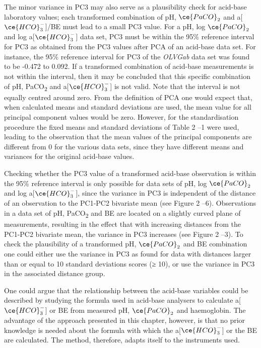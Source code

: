 \documentclass[
  12pt,
  a4paperpaper,
]{report}
\begin{document}
The minor variance in PC3 may also serve as a plausibility check for
acid-base laboratory values; each transformed combination of pH,
\(\ce{PaCO}_{2}\) and a{[}\(\ce{HCO}_{3}^{-}\){]}/BE must lead to a
small PC3 value. For a pH, log \(\ce{PaCO}_{2}\) and log
a{[}\(\ce{HCO}_{3}^{-}\){]} data set, PC3 must be within the 95\%
reference interval for PC3 as obtained from the PC3 values after PCA of
an acid-base data set. For instance, the 95\% reference interval for PC3
of the \emph{OLVGab} data set was found to be -0.472 to 0.092. If a
transformed combination of acid-base measurements is not within the
interval, then it may be concluded that this specific combination of pH,
PaCO­\textsubscript{2} and a{[}\(\ce{HCO}_{3}^{-}\){]} is not valid.
Note that the interval is not equally centred around zero. From the
definition of PCA one would expect that, when calculated means and
standard deviations are used, the mean value for all principal component
values would be zero. However, for the standardisation procedure the
fixed means and standard deviations of Table 2 --1 were used, leading to
the observation that the mean values of the principal components are
different from 0 for the various data sets, since they have different
means and variances for the original acid-base values.

Checking whether the PC3 value of a transformed acid-base observation is
within the 95\% reference interval is only possible for data sets of pH,
log \(\ce{PaCO}_{2}\) and log a{[}\(\ce{HCO}_{3}^{-}\){]}, since the
variance in PC3 is independent of the distance of an observation to the
PC1-PC2 bivariate mean (see Figure 2 --6). Observations in a data set of
pH, PaCO­­\textsubscript{2} and BE are located on a slightly curved
plane of measurements, resulting in the effect that with increasing
distances from the PC1-PC2 bivariate mean, the variance in PC3 increases
(see Figure 2 --3). To check the plausibility of a transformed pH,
\(\ce{PaCO}_{2}\) and BE combination one could either use the variance
in PC3 as found for data with distances larger than or equal to 10
standard deviations scores (≥ 10), or use the variance in PC3 in the
associated distance group.

One could argue that the relationship between the acid-base variables
could be described by studying the formula used in acid-base analysers
to calculate a{[}\(\ce{HCO}_{3}^{-}\){]} or BE from measured pH,
\(\ce{PaCO}_{2}\) and haemoglobin. The advantage of the approach
presented in this chapter, however, is that no prior knowledge is needed
about the formula with which the a{[}\(\ce{HCO}_{3}^{-}\){]} or the BE
are calculated. The method, therefore, adapts itself to the instruments
used.
\end{document}

